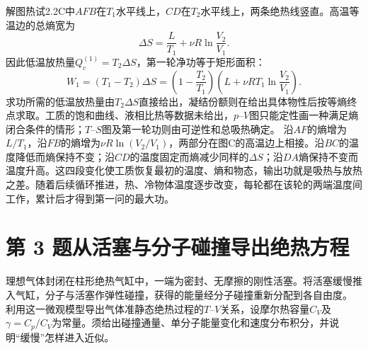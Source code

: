 \documentclass[UTF8,fontset=fandol,a4paper,11pt]{ctexart}
\newcommand{\figcaption}[1]{\par\vspace{2pt}{\small\color{muted}#1}\par}
\begin{document}
解图热试2.2C中$AFB$在$T_1$水平线上，$CD$在$T_2$水平线上，两条绝热线竖直。高温等温边的总熵宽为
\[
\Delta S=\frac{L}{T_1}+\nu R\ln\frac{V_2}{V_1}.
\]
因此低温放热量$Q_c^{(1)}=T_2\Delta S$，第一轮净功等于矩形面积：
\[
\boxed{W_1=(T_1-T_2)\Delta S
=\left(1-\frac{T_2}{T_1}\right)
\left(L+\nu RT_1\ln\frac{V_2}{V_1}\right)}.
\]
求功所需的低温放热量由$T_2\Delta S$直接给出，凝结份额则在给出具体物性后按等熵终点求取。工质的饱和曲线、液相比热等数据未给出，$p$--$V$图只能定性画一种满足熵闭合条件的情形；$T$--$S$图及第一轮功则由可逆性和总吸热确定。
沿$AF$的熵增为$L/T_1$，沿$FB$的熵增为$\nu R\ln(V_2/V_1)$，两部分在图C的高温边上相接。沿$BC$的温度降低而熵保持不变；沿$CD$的温度固定而熵减少同样的$\Delta S$；沿$DA$熵保持不变而温度升高。这四段变化使工质恢复最初的温度、熵和物态，输出功就是吸热与放热之差。随着后续循环推进，热、冷物体温度逐步改变，每轮都在该轮的两端温度间工作，累计后才得到第一问的最大功。





\section*{第 3 题\quad 从活塞与分子碰撞导出绝热方程}\label{q:3}


理想气体封闭在柱形绝热气缸中，一端为密封、无摩擦的刚性活塞。将活塞缓慢推入气缸，分子与活塞作弹性碰撞，获得的能量经分子碰撞重新分配到各自由度。
利用这一微观模型导出气体准静态绝热过程的$T$--$V$关系，设摩尔热容量$C_V$及$\gamma=C_p/C_V$为常量。须给出碰撞通量、单分子能量变化和速度分布积分，并说明“缓慢”怎样进入近似。


\begin{center}\begin{minipage}{.98\linewidth}\centering
{}
\figcaption{图热试2.3\quad 活塞在右端向左推进，气体分子朝右迎撞。}
\end{minipage}\end{center}
\end{document}
